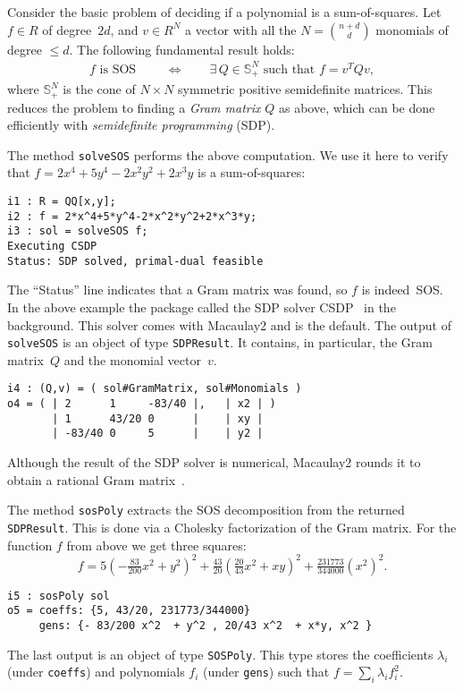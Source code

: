\documentclass[11pt]{amsart}
\theoremstyle{plain}%
\theoremstyle{definition}
\theoremstyle{remark}
\newcommand{\Mac}{Macaulay2\xspace}
\begin{document}
Consider the basic problem of deciding if a polynomial is a sum-of-squares.
Let $f \!\in\! R$ of degree~$2d$,
and $v \!\in\! R^N$ a vector with all the $N \!=\! \binom{n+d}{d}$ monomials of degree $\leq\!d$.
The following fundamental result holds:
\begin{align*}
  f \text{ is SOS } 
  \qquad\iff\qquad
  \exists\, Q\in \mathbb{S}_+^N \text{ such that } f = v^T Q v,
\end{align*}
where $\mathbb{S}_+^N$ is the cone of $N{\times} N$ symmetric positive semidefinite matrices.
This reduces the problem to finding a \emph{Gram matrix} $Q$ as above, which can be done efficiently with \emph{semidefinite programming} (SDP).

The method \verb|solveSOS| performs the above computation.
We use it here to verify that $f = 2 x^4 {+} 5 y^4 {-} 2 x^2 y^2 {+} 2 x^3 y$ is a sum-of-squares:
{\small
\begin{verbatim}
i1 : R = QQ[x,y];
i2 : f = 2*x^4+5*y^4-2*x^2*y^2+2*x^3*y;
i3 : sol = solveSOS f;
Executing CSDP
Status: SDP solved, primal-dual feasible
\end{verbatim}
}
\noindent
The ``Status'' line indicates that a Gram matrix was found, so $f$ is indeed~SOS.
In the above example the package called the SDP solver CSDP~\cite{borchers1999csdp} in the background.
This solver comes with \Mac and is the default.
The output of \verb|solveSOS| is an object of type \verb|SDPResult|.
It contains, in particular, the Gram matrix~$Q$ and the monomial vector~$v$.
{\small
\begin{verbatim}
i4 : (Q,v) = ( sol#GramMatrix, sol#Monomials )
o4 = ( | 2      1     -83/40 |,   | x2 | )
       | 1      43/20 0      |    | xy | 
       | -83/40 0     5      |    | y2 | 
\end{verbatim}
}
\noindent
Although the result of the SDP solver is numerical, Macaulay2 rounds it to obtain a rational Gram matrix~\cite{peyrl2008computing}.

The method \verb|sosPoly| extracts the SOS decomposition from the returned \verb|SDPResult|.
This is done via a Cholesky factorization of the Gram matrix.
For the function $f$ from above we get three squares:
\[
  f = 5(-\tfrac{83}{200} x^{2}+y^{2})^{2} + \tfrac{43}{20}
  (\tfrac{20}{43}x^{2} + xy)^{2} + \tfrac{231773}{344000} (x^{2})^{2}.
\]
{\small
\begin{verbatim}
i5 : sosPoly sol
o5 = coeffs: {5, 43/20, 231773/344000}
     gens: {- 83/200 x^2  + y^2 , 20/43 x^2  + x*y, x^2 }
\end{verbatim}
}
\noindent
The last output is an object of type \verb|SOSPoly|.
This type stores the coefficients $\lambda_{i}$ (under \verb|coeffs|) and polynomials $f_{i}$ (under \verb|gens|) such that $f = \sum_{i}\lambda_{i}f_{i}^{2}$.
\end{document}
